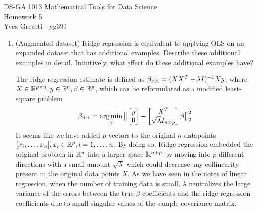 \documentclass[12pt,twoside]{article}
\begin{document}
\noindent DS-GA.1013 Mathematical Tools for Data Science \\
Homework 5\\
Yves Greatti - yg390\\

\begin{enumerate}

\item (Augmented dataset) Ridge regression is equivalent to applying OLS on an expanded dataset that has additional examples. Describe these additional examples in detail. Intuitively, what effect do these additional examples have?\\
\medskip

The ridge regression estimate is defined as $\beta_{\operatorname{RR}} = (X X^T + \lambda I)^{-1} X y$, where $X \in \mathbb{R}^{p \times n}, y \in \mathbb{R}^n, \beta \in \mathbb{R}^p$, which can be reformulated as a modified least-square problem
$$\beta_{\operatorname{RR}} = \operatorname*{arg\,min}_\beta \big\| \begin{bmatrix} y   \\ 0 \end{bmatrix} - \begin{bmatrix} X^T   \\ \sqrt{\lambda} I_{n \times p} \end{bmatrix} \beta \big\|_2^2$$
It seems like we have added $p$ vectors to the original $n$ datapoints $[x_i, \ldots, x_n], x_i \in \mathbb{R}^p, i=1, \ldots, n$. By doing so, Ridge regression embedded the original problem in $\mathbb{R}^n$ into a larger space $\mathbb{R}^{n+p}$ by moving into $p$ different 
directions with a small amount $\sqrt{\lambda}$ which could decrease any collinearity present in the original data points $X$. As we have seen in the notes of linear regression, when the number of training data is small, $\lambda$ neutralizes the large variance of the errors between the true  $\beta$ coefficients and the ridge regression coefficients due to small singular values  of the sample covariance matrix.
 
 \newpage
 

\end{enumerate}
\end{document}
